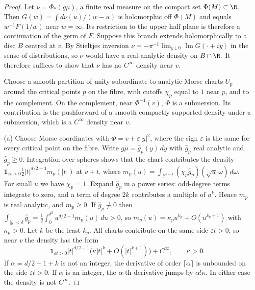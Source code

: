 \documentclass[11pt,a4paper]{article}
\theoremstyle{definition}
\theoremstyle{remark}
\numberwithin{equation}{section}
\begin{document}
\begin{proof}
Let $\nu=\Phi_*(g\mu)$, a finite real measure on the compact set
$\Phi(M)\subset\R$. Then $G(w)=\int d\nu(u)/(w-u)$ is holomorphic off $\Phi(M)$ and
equals $w^{-1}F(1/w)$ near $w=\infty$. Its restriction to the upper half
plane is therefore a continuation of the germ of $F$. Suppose this branch
extends holomorphically to a disc $B$ centred at $v$. By Stieltjes inversion
$\nu=-\pi^{-1}\lim_{y\downarrow0}\operatorname{Im}G(\cdot+iy)$ in the sense
of distributions, so $\nu$ would have a real-analytic density on $B\cap\R$.
It therefore suffices to show that $\nu$ has no $C^\infty$ density near $v$.

Choose a smooth partition of unity subordinate to analytic Morse charts
$U_p$ around the critical points $p$ on the fibre, with cutoffs $\chi_p$
equal to $1$ near $p$, and to the complement. On the complement, near
$\Phi^{-1}(v)$, $\Phi$ is a submersion. Its contribution is the pushforward
of a smooth compactly supported density under a submersion, which is a
$C^\infty$ density near $v$.

(a) Choose Morse coordinates with $\Phi=v+\varepsilon|y|^2$, where the sign
$\varepsilon$ is the same for every critical point on the fibre. Write
$g\mu=\widehat g_p(y)\,dy$ with $\widehat g_p$ real analytic and
$\widehat g_p\ge0$. Integration over spheres shows that the chart
contributes the density
$\mathbf 1_{\varepsilon t>0}\tfrac12|t|^{d/2-1}m_p(|t|)$ at $v+t$, where
$m_p(u)=\int_{\mathbb S^{d-1}}(\chi_p\widehat g_p)(\sqrt u\,\omega)\,d\omega$.
For small $u$ we have $\chi_p=1$. Expand $\widehat g_p$ in a power series:
odd-degree terms integrate to zero, and a term of degree $2k$ contributes a
multiple of $u^k$. Hence $m_p$ is real analytic, and $m_p\ge0$. If
$\widehat g_p\not\equiv0$ then
$\int_{|y|<\delta}\widehat g_p=\tfrac12\int_0^{\delta^2}u^{d/2-1}m_p(u)\,du>0$,
so $m_p(u)=\kappa_pu^{k_p}+O(u^{k_p+1})$ with $\kappa_p>0$. Let $k$ be the
least $k_p$. All charts contribute on the same side $\varepsilon t>0$, so
near $v$ the density has the form
\[
 \mathbf 1_{\varepsilon t>0}|t|^{d/2-1}\bigl(\kappa|t|^k+O(|t|^{k+1})\bigr)
 +C^\infty,\qquad \kappa>0 .
\]
If $\alpha=d/2-1+k$ is not an integer, the derivative of order
$\lceil\alpha\rceil$ is unbounded on the side $\varepsilon t>0$. If
$\alpha$ is an integer, the $\alpha$-th derivative jumps by $\alpha!\kappa$.
In either case the density is not $C^\infty$.


\end{proof}
\end{document}
